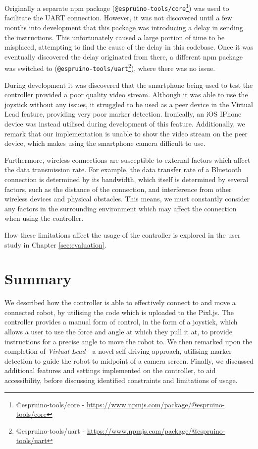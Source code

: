 \documentclass{l4proj}
\begin{document}
Originally a separate npm package (\lstinline{@espruino-tools/core}\footnote{@espruino-tools/core - \url{https://www.npmjs.com/package/@espruino-tools/core}}) was used to facilitate the UART connection. However, it was not discovered until a few months into development that this package was introducing a delay in sending the instructions. This unfortunately caused a large portion of time to be misplaced, attempting to find the cause of the delay in this codebase. Once it was eventually discovered the delay originated from there, a different npm package was switched to (\lstinline{@espruino-tools/uart}\footnote{@espruino-tools/uart - \url{https://www.npmjs.com/package/@espruino-tools/uart}}), where there was no issue.

During development it was discovered that the smartphone being used to test the controller provided a poor quality video stream. Although it was able to use the joystick without any issues, it struggled to be used as a peer device in the Virtual Lead feature, providing very poor marker detection. Ironically, an iOS IPhone device was instead utilised during development of this feature. Additionally, we remark that our implementation is unable to show the video stream on the peer device, which makes using the smartphone camera difficult to use.

Furthermore, wireless connections are susceptible to external factors which affect the data transmission rate. For example, the data transfer rate of a Bluetooth connection is determined by its bandwidth, which itself is determined by several factors, such as the distance of the connection, and interference from other wireless devices and physical obstacles. This means, we must constantly consider any factors in the surrounding environment which may affect the connection when using the controller.

How these limitations affect the usage of the controller is explored in the user study in Chapter \ref{sec:evaluation}.


\section{Summary}
We described how the controller is able to effectively connect to and move a connected robot, by utilising the code which is uploaded to the Pixl.js. The controller provides a manual form of control, in the form of a joystick, which allows a user to use the force and angle at which they pull it at, to provide instructions for a precise angle to move the robot to. We then remarked upon the completion of \textit{Virtual Lead} - a novel self-driving approach, utilising marker detection to guide the robot to midpoint of a camera screen. Finally, we discussed additional features and settings implemented on the controller, to aid accessibility, before discussing identified constraints and limitations of usage.
\end{document}
